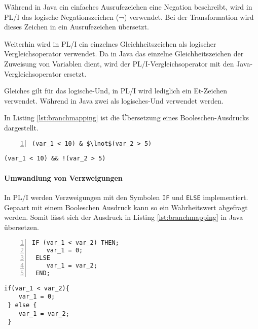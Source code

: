 Während in Java ein einfaches Ausrufezeichen eine Negation beschreibt, wird in PL/I das logische Negationszeichen (¬) verwendet. Bei der Transformation wird dieses Zeichen in ein Ausrufezeichen übersetzt.

Weiterhin wird in PL/I ein einzelnes Gleichheitszeichen als logischer Vergleichsoperator verwendet. Da in Java das einzelne Gleichheitszeichen der Zuweisung von Variablen dient, wird der PL/I-Vergleichsoperator mit den Java-Vergleichsoperator ersetzt.

Gleiches gilt für das logische-Und, in PL/I wird lediglich ein Et-Zeichen verwendet. Während in Java zwei als logisches-Und verwendet werden.

In Listing \ref{lst:branchmapping} ist die Übersetzung eines Booleschen-Ausdrucks dargestellt.

\begin{minipage}[b]{0.48\linewidth}
	\centering
	\lstset{language=PL/I,label=SliceExaple}
	\begin{lstlisting}[frame=single, numbers=left, mathescape,%
	caption={Boolescher-Ausdruck}, label={lst:branchmapping}]	
	(var_1 < 10) & $\lnot$(var_2 > 5)
	\end{lstlisting}
\end{minipage}
\hspace{0.5cm}
\begin{minipage}[b]{0.48\linewidth}
	\centering
	\lstset{language=Java,label=SliceExaple}
	\begin{lstlisting}[frame=single, mathescape,%
title={" "}]
	(var_1 < 10) && !(var_2 > 5)
	\end{lstlisting}
\end{minipage}
\pagebreak

\paragraph{Umwandlung von Verzweigungen}

In PL/I werden Verzweigungen mit den Symbolen \verb+IF+ und \verb+ELSE+ implementiert. 
Gepaart mit einem Booleschen Ausdruck kann so ein Wahrheitswert abgefragt werden.
Somit lässt sich der Ausdruck in Listing \ref{lst:branchmapping} in Java übersetzen.

\begin{minipage}[b]{0.48\linewidth}
	\centering
	\lstset{language=PL/I,label=SliceExaple}
	\begin{lstlisting}[frame=single, numbers=left, mathescape,%
		caption={Verzweigungen}, label={lst:branchmapping}]	
 IF (var_1 < var_2) THEN;
 	var_1 = 0;
 ELSE
	var_1 = var_2;
 END;
	\end{lstlisting}
\end{minipage}
\hspace{0.5cm}
\begin{minipage}[b]{0.48\linewidth}
	\centering
	\lstset{language=Java,label=SliceExaple}
	\begin{lstlisting}[frame=single, mathescape,%
		title={" "}]
 if(var_1 < var_2){
 	var_1 = 0;	
 } else {
	var_1 = var_2;
 }
	\end{lstlisting}
\end{minipage} 


